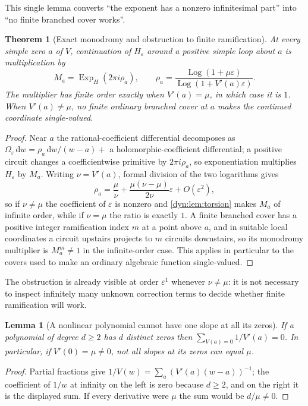 \documentclass[11pt,letterpaper]{article}
\newtheorem{theorem}{Theorem}[section]
\newtheorem{lemma}[lemma]{Lemma}
\theoremstyle{definition}
\theoremstyle{remark}
\newcommand{\Log}{\operatorname{Log}}
\newcommand{\ExpH}{\operatorname{Exp}_{\!H}}
\newcommand{\eps}{\varepsilon}
\newcommand{\dd}{\,\mathrm d}
\numberwithin{equation}{section}
\begin{document}
This single lemma converts ``the exponent has a nonzero infinitesimal
part'' into ``no finite branched cover works''.

\begin{theorem}[Exact monodromy and obstruction to finite ramification]
\label{dyn:thm:monodromy}
At every simple zero $a$ of $V$, continuation of $H_\eps$ around a positive
simple loop about $a$ is multiplication by
\begin{equation}\label{dyn:eq:monodromy}
 M_a=\ExpH(2\pi i\rho_a),\qquad
 \rho_a=\frac{\Log(1+\mu\eps)}{\Log(1+V'(a)\eps)} .
\end{equation}
The multiplier has finite order exactly when $V'(a)=\mu$, in which case it
is $1$. When $V'(a)\ne\mu$, \emph{no} finite ordinary branched cover at $a$
makes the continued coordinate single-valued.
\end{theorem}
\begin{proof}
Near $a$ the rational-coefficient differential decomposes as
$\Omega_\eps\dd w=\rho_a\dd w/(w-a)+$ a holomorphic-coefficient
differential; a positive circuit changes a coefficientwise primitive by
$2\pi i\rho_a$, so exponentiation multiplies $H_\eps$ by $M_a$. Writing
$\nu=V'(a)$, formal division of the two logarithms gives
\begin{equation}\label{dyn:eq:rhofirst}
 \rho_a=\frac\mu\nu+\frac{\mu(\nu-\mu)}{2\nu}\eps+O(\eps^{2}),
\end{equation}
so if $\nu\ne\mu$ the coefficient of $\eps$ is nonzero and
\cref{dyn:lem:torsion} makes $M_a$ of infinite order, while if $\nu=\mu$
the ratio is exactly $1$. A finite branched cover has a positive integer
ramification index $m$ at a point above $a$, and in suitable local
coordinates a circuit upstairs projects to $m$ circuits downstairs, so its
monodromy multiplier is $M_a^{m}\ne1$ in the infinite-order case. This
applies in particular to the covers used to make an ordinary algebraic
function single-valued.
\end{proof}

The obstruction is already visible at order $\eps^{1}$ whenever
$\nu\ne\mu$: it is not necessary to inspect infinitely many unknown
correction terms to decide whether finite ramification will work.

\begin{lemma}[A nonlinear polynomial cannot have one slope at all its
zeros]\label{dyn:lem:slopes}
If a polynomial of degree $d\ge2$ has $d$ distinct zeros then
$\sum_{V(a)=0}1/V'(a)=0$. In particular, if $V'(0)=\mu\ne0$, not all slopes
at its zeros can equal $\mu$.
\end{lemma}
\begin{proof}
Partial fractions give $1/V(w)=\sum_a(V'(a)(w-a))^{-1}$; the coefficient of
$1/w$ at infinity on the left is zero because $d\ge2$, and on the right it
is the displayed sum. If every derivative were $\mu$ the sum would be
$d/\mu\ne0$.
\end{proof}
\end{document}
